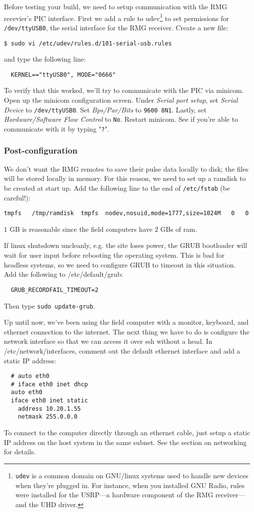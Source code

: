 \documentclass[letter]{article}
\newcounter{foot}
\begin{document}
Before testing your build, we need to setup communication with the RMG recevier's PIC interface. First we 
add a rule to udev\footnote{\texttt{udev} is a common domain on GNU/linux systems used to handle 
new devices when they're plugged in. For instance, when you installed GNU Radio, rules were installed 
for the USRP---a hardware component of the RMG receiver---and the UHD driver.} to set permissions for 
\texttt{/dev/ttyUSB0}, the serial interface for the RMG receiver. Create a new file: 
\begin{verbatim}
$ sudo vi /etc/udev/rules.d/101-serial-usb.rules
\end{verbatim}
and type the following line: 
\begin{verbatim}
  KERNEL=="ttyUSB0", MODE="0666"
\end{verbatim}
To verify that this worked, we'll try to communicate with the PIC via minicom. Open up the minicom
configuration screen. Under \textit{Serial port setup}, set \textit{Serial Device} to \texttt{/dev/ttyUSB0}.
Set \textit{Bps/Par/Bits} to \texttt{9600 8N1}. Lastly, set \textit{Hardware/Software Flow Control} to 
\texttt{No}. Restart minicom. See if you're able to communicate with it by typing "\texttt{?}".  

\subsubsection{Post-configuration} 

We don't want the RMG remotes to save their pulse data locally to disk; the files will be stored
locally in memory. For this reason, we need to set up a ramdisk to be created at start up. Add 
the following line to the end of \texttt{/etc/fstab} (be careful!): 
\begin{verbatim}
tmpfs   /tmp/ramdisk  tmpfs  nodev,nosuid,mode=1777,size=1024M   0   0
\end{verbatim}
1 GB is reasonable since the field computers have 2 GBs of ram. 

If linux shutsdown uncleanly, e.g. the site loses power, the GRUB bootloader will wait for user 
input before rebooting the operating system. This is bad for headless systems, so we need to 
configure GRUB to timeout in this situation. Add the following to /etc/default/grub: 
\begin{verbatim}
  GRUB_RECORDFAIL_TIMEOUT=2
\end{verbatim}
Then type \texttt{sudo update-grub}. 

Up until now, we've been using the field computer with a monitor, keyboard, and ethernet connection
to the internet. The next thing we have to do is configure the network interface so that we can 
access it over ssh without a head. In /etc/network/interfaces, comment out the default 
ethernet interface and add a static IP address: 
\begin{verbatim}
  # auto eth0
  # iface eth0 inet dhcp
  auto eth0
  iface eth0 inet static
    address 10.20.1.55
    netmask 255.0.0.0
\end{verbatim}
To connect to the computer directly through an ethernet cable, just setup a static IP address on 
the host system in the same subnet. See the section on networking for details. 
\end{document}
